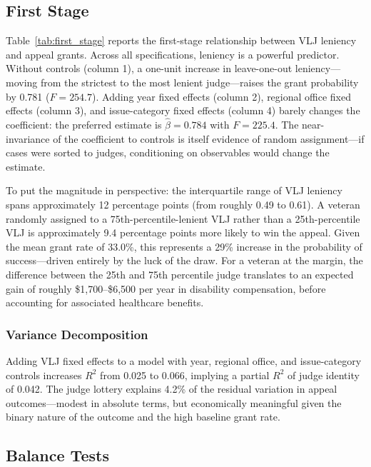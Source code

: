 \documentclass[12pt]{article}
\begin{document}
\subsection{First Stage}

Table~\ref{tab:first_stage} reports the first-stage relationship between VLJ leniency and appeal grants. Across all specifications, leniency is a powerful predictor. Without controls (column 1), a one-unit increase in leave-one-out leniency---moving from the strictest to the most lenient judge---raises the grant probability by 0.781 ($F = 254.7$). Adding year fixed effects (column 2), regional office fixed effects (column 3), and issue-category fixed effects (column 4) barely changes the coefficient: the preferred estimate is $\hat{\beta} = 0.784$ with $F = 225.4$. The near-invariance of the coefficient to controls is itself evidence of random assignment---if cases were sorted to judges, conditioning on observables would change the estimate.



To put the magnitude in perspective: the interquartile range of VLJ leniency spans approximately 12 percentage points (from roughly 0.49 to 0.61). A veteran randomly assigned to a 75th-percentile-lenient VLJ rather than a 25th-percentile VLJ is approximately 9.4 percentage points more likely to win the appeal. Given the mean grant rate of 33.0\%, this represents a 29\% increase in the probability of success---driven entirely by the luck of the draw. For a veteran at the margin, the difference between the 25th and 75th percentile judge translates to an expected gain of roughly \$1,700--\$6,500 per year in disability compensation, before accounting for associated healthcare benefits.

\subsubsection*{Variance Decomposition} Adding VLJ fixed effects to a model with year, regional office, and issue-category controls increases $R^2$ from 0.025 to 0.066, implying a partial $R^2$ of judge identity of 0.042. The judge lottery explains 4.2\% of the residual variation in appeal outcomes---modest in absolute terms, but economically meaningful given the binary nature of the outcome and the high baseline grant rate.


\subsection{Balance Tests}
\end{document}
